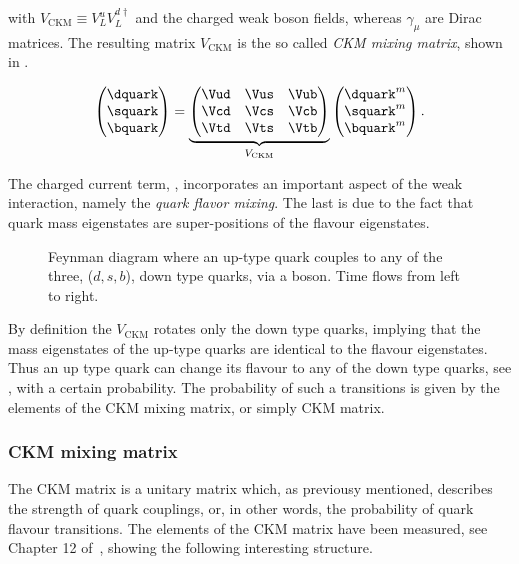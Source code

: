 \noindent with $V_{\text{CKM}} \equiv V^u_LV^{d\dagger}_L$ and \Wpm the charged weak boson fields, whereas $\gamma_\mu$ are Dirac matrices.
The resulting matrix $V_{\text{CKM}}$ is the so called {\it CKM mixing matrix}, shown in .

\begin{equation}
  \centering
  \begin{pmatrix} \dquark \\ \squark \\ \bquark  \end{pmatrix} =
  \underbrace{\begin{pmatrix} \Vud & \Vus & \Vub \\ \Vcd & \Vcs & \Vcb \\ \Vtd & \Vts & \Vtb \end{pmatrix}}_{V_{\text{CKM}}}
    \begin{pmatrix} \dquark^m \\ \squark^m \\ \bquark^m  \end{pmatrix}.
      \label{quark_field_rotation}
  \end{equation}

The charged current term, , incorporates an important aspect of the weak interaction,
namely the {\it quark flavor mixing}. The last is due to the fact that quark mass eigenstates are super-positions
of the flavour eigenstates.

\begin{figure}[h!]
  \centering
  {\sffamily }
  \caption{Feynman diagram where an up-type quark couples to any of the three, ($d,s,b$), down type quarks,
           via a \Wp boson. Time flows from left to right.}
  \label{QuarkMixing}
\end{figure}

\noindent By definition the $V_{\text{CKM}}$ rotates only the down type quarks, implying that
the mass eigenstates of the up-type quarks are identical to the flavour eigenstates. Thus an up type quark
can change its flavour to any of the down type quarks, see , with a certain probability.
The probability of such a transitions is given by the elements of the CKM mixing matrix, or simply CKM matrix.

\subsubsection{CKM mixing matrix}
The CKM matrix is a unitary matrix which, as previousy mentioned, describes the strength of quark couplings,
or, in other words, the probability of quark flavour transitions. The elements of the CKM matrix have been measured, see \eg Chapter 12 of~\cite{PDG},
showing the following interesting structure.


